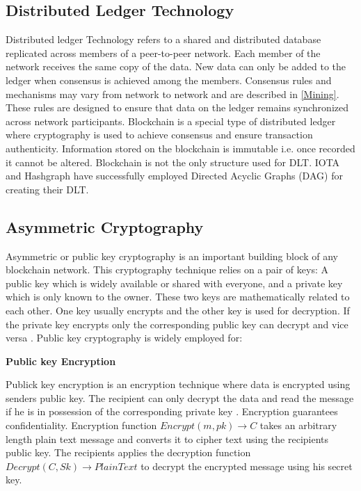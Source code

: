 \subsection{Distributed Ledger Technology} 
Distributed ledger Technology refers to a shared and distributed database replicated across members of a peer-to-peer network. Each member of the network receives the same copy of the data. New data can only be added to the ledger when consensus is achieved among the members. Consensus rules and mechanisms may vary from network to network and are described in \ref{Mining}. These rules are designed to ensure that data on the ledger remains synchronized across network participants. Blockchain is a special type of distributed ledger where cryptography is used to achieve consensus and ensure transaction authenticity.  Information stored on the blockchain is immutable i.e. once recorded it cannot be altered. Blockchain is not the only structure used for DLT. IOTA \cite{wiki:003} and Hashgraph have successfully employed Directed Acyclic Graphs (DAG) \cite{wiki:002} for creating their DLT. 
\vspace{0.5cm}
\subsection{Asymmetric Cryptography} \label{AC}
Asymmetric or public key cryptography is an important building block of any blockchain network. This cryptography technique relies on a pair of keys: A public key which is widely available or shared with everyone, and a private key which is only known to the owner. These two keys are mathematically related to each other. One key usually encrypts and the other key is used for decryption. If the private key encrypts only the corresponding public key can decrypt and vice versa \cite{wiki:004}. Public key cryptography is widely employed for:

\textbf{Public key Encryption} 

Publick key encryption is an encryption technique where data is encrypted using senders public key. The recipient can only decrypt the data and read the message if he is in possession of the corresponding private key \cite{wiki:004}. Encryption guarantees confidentiality. Encryption function $Encrypt(m,pk) \rightarrow C$ takes an arbitrary length plain text message and converts it to cipher text using the recipients public key. The recipients applies the decryption function $Decrypt(C,Sk) \rightarrow PlainText$ to decrypt the encrypted message using his secret key.

